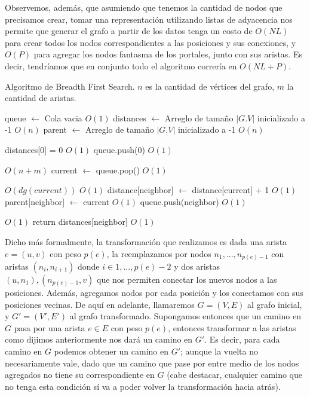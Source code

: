 \documentclass{article}
\theoremstyle{definition}
\theoremstyle{remark}
\begin{document}
Observemos, además, que asumiendo que tenemos la cantidad de nodos que precisamos crear, tomar una representación utilizando listas de adyacencia nos permite que generar el grafo a partir de los datos tenga un costo de $O(NL)$ para crear todos los nodos correspondientes a las posiciones y sus conexiones, y $O(P)$ para agregar los nodos fantasma de los portales, junto con sus aristas. Es decir, tendríamos que en conjunto todo el algoritmo correría en $O(NL + P)$.

\begin{algorithm}[h!]
\caption{Algoritmo de Breadth First Search. $n$ es la cantidad de vértices del grafo, $m$ la cantidad de aristas. \label{alg:bfs}}

\begin{algorithmic}[h!]
\State queue $\gets$ Cola vacia \Comment $O(1)$
\State distances $\gets$ Arreglo de tamaño $|G.V|$ inicializado a -1 \Comment $O(n)$
\State parent $\gets$ Arreglo de tamaño $|G.V|$ inicializado a -1 \Comment $O(n)$

\State distances[0] = 0 \Comment $O(1)$
\State queue.push(0) \Comment $O(1)$

 \Comment $O(n + m)$
    \State current $\gets$ queue.pop() \Comment $O(1)$
    
     \Comment $O(dg(current))$
         \Comment $O(1)$
            \State distance[neighbor] $\gets$ distance[current] + 1 \Comment $O(1)$
            \State parent[neighbor] $\gets$ current \Comment $O(1)$
            \State queue.push(neighbor) \Comment $O(1)$
        \EndIf
        
         \Comment $O(1)$
            \State return distances[neighbor] \Comment $O(1)$
        \EndIf
    \EndFor
\EndWhile
\EndProcedure
\end{algorithmic}
\end{algorithm}

Dicho más formalmente, la transformación que realizamos es dada una arista $e = (u, v)$ con peso $p(e)$, la reemplazamos por nodos $n_1, ..., n_{p(e)-1}$ con aristas $(n_i, n_{i+1})$ donde $i \in {1, ..., p(e) - 2}$ y dos aristas $(u, n_1), (n_{p(e)-1}, v)$ que nos permiten conectar los nuevos nodos a las posiciones. Además, agregamos nodos por cada posición y los conectamos con sus posiciones vecinas. De aquí en adelante, llamaremos $G = (V, E)$ al grafo inicial, y $G' = (V', E')$ al grafo transformado. Supongamos entonces que un camino en $G$ pasa por una arista $e \in E$ con peso $p(e)$, entonces transformar a las aristas como dijimos anteriormente nos dará un camino en $G'$. Es decir, para cada camino en $G$ podemos obtener un camino en $G'$; aunque la vuelta no necesariamente vale, dado que un camino que pase por entre medio de los nodos agregados no tiene su correspondiente en $G$ (cabe destacar, cualquier camino que no tenga esta condición sí va a poder volver la transformación hacia atrás).
\end{document}
